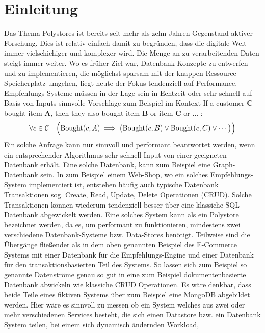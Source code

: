 

\chapter{Einleitung}
\label{ch:intro}
Das Thema Polystores ist bereits seit mehr als zehn Jahren Gegenstand aktiver Forschung. 
Dies ist relativ einfach damit zu begründen, dass die digitale Welt immer vielschichiger und komplexer wird.
Die Menge an zu verarbeitenden Daten steigt immer weiter. Wo es früher Ziel war, Datenbank Konzepte
zu entwerfen und zu implementieren, die möglichst sparsam mit der knappen Ressource Speicherplatz
umgehen, liegt heute der Fokus tendenziell auf Performance.
Empfehlungs-Systeme müssen in der Lage sein in Echtzeit oder sehr schnell auf Basis von Inputs
sinnvolle Vorschläge zum Beispiel im Kontext If a customer $\mathbf{C}$ bought item $\mathbf{A}$, then they also bought item $\mathbf{B}$ or item $\mathbf{C}$ or $\ldots$
:
\[
\forall c \in \mathcal{C} \quad \Bigl( \text{Bought}(c, A) \implies \bigl( \text{Bought}(c, B) \lor \text{Bought}(c, C) \lor \cdots \bigr) \Bigr)
\]
Ein solche Anfrage kann nur sinnvoll und performant beantwortet werden, 
wenn ein entsprechender Algorithmus sehr schnell Input von einer geeigneten
Datenbank erhält. Eine solche Datenbank, kann zum Beispiel eine Graph-Datenbank sein.
In zum Beispiel einem Web-Shop, wo ein solches Empfehlungs-System implementiert ist, entstehen
häufig auch typische Datenbank Transaktionen sog. Create, Read, Update, Delete Operationen (CRUD).
Solche Transaktionen können wiederum tendenziell besser über eine klassiche SQL Datenbank 
abgewickelt werden.
Eine solches System kann als ein Polystore bezeichnet werden, da es, um performant zu funktionieren,
mindestens zwei verschiedene Datenbank-Systeme bzw. Data-Stores benötigt.
Teilweise sind die Übergänge fließender als in dem oben genannten Beispiel des E-Commerce Systems 
mit einer Datenbank für die Empfehlungs-Engine und einer Datenbank für den transaktionsbasierten 
Teil des Systems.
So lassen sich zum Beispiel so genannte Datenströme genau so gut in eine zum Beispiel
dokumentenbasierte Datenbank abwickeln wie klassiche CRUD Operationen. Es wäre denkbar, dass beide
Teile eines fiktiven Systems über zum Beispiel eine MongoDB abgebildet werden.
Hier wäre es sinnvoll zu messen ob ein System welches aus zwei oder mehr verschiedenen Services besteht,
die sich einen Datastore bzw. ein Datenbank System teilen, bei einem sich dynamisch ändernden Workload,
